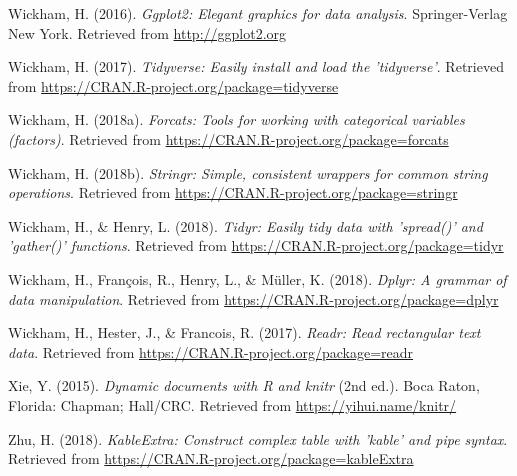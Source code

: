 \documentclass[man]{apa6}
\begin{document}
\hypertarget{ref-R-ggplot2}{}
Wickham, H. (2016). \emph{Ggplot2: Elegant graphics for data analysis}.
Springer-Verlag New York. Retrieved from \url{http://ggplot2.org}

\hypertarget{ref-R-tidyverse}{}
Wickham, H. (2017). \emph{Tidyverse: Easily install and load the
'tidyverse'}. Retrieved from
\url{https://CRAN.R-project.org/package=tidyverse}

\hypertarget{ref-R-forcats}{}
Wickham, H. (2018a). \emph{Forcats: Tools for working with categorical
variables (factors)}. Retrieved from
\url{https://CRAN.R-project.org/package=forcats}

\hypertarget{ref-R-stringr}{}
Wickham, H. (2018b). \emph{Stringr: Simple, consistent wrappers for
common string operations}. Retrieved from
\url{https://CRAN.R-project.org/package=stringr}

\hypertarget{ref-R-tidyr}{}
Wickham, H., \& Henry, L. (2018). \emph{Tidyr: Easily tidy data with
'spread()' and 'gather()' functions}. Retrieved from
\url{https://CRAN.R-project.org/package=tidyr}

\hypertarget{ref-R-dplyr}{}
Wickham, H., François, R., Henry, L., \& Müller, K. (2018). \emph{Dplyr:
A grammar of data manipulation}. Retrieved from
\url{https://CRAN.R-project.org/package=dplyr}

\hypertarget{ref-R-readr}{}
Wickham, H., Hester, J., \& Francois, R. (2017). \emph{Readr: Read
rectangular text data}. Retrieved from
\url{https://CRAN.R-project.org/package=readr}

\hypertarget{ref-R-knitr}{}
Xie, Y. (2015). \emph{Dynamic documents with R and knitr} (2nd ed.).
Boca Raton, Florida: Chapman; Hall/CRC. Retrieved from
\url{https://yihui.name/knitr/}

\hypertarget{ref-R-kableExtra}{}
Zhu, H. (2018). \emph{KableExtra: Construct complex table with 'kable'
and pipe syntax}. Retrieved from
\url{https://CRAN.R-project.org/package=kableExtra}

\endgroup
\end{document}
